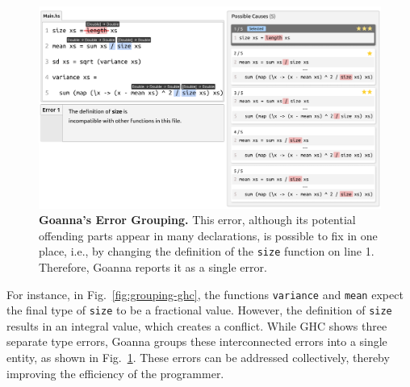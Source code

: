 \documentclass[pdflatex,lineno,sn-nature,Numbered]{sn-jnl}%
\begin{document}
        \begin{figure}[ht!]
        \centering
        \includegraphics[width=\linewidth]{images/Goanna-Error-Grouping.pdf}
        \caption[Goanna's Error Grouping]{\textbf{Goanna's Error Grouping.} This error, although its potential offending parts appear in many declarations, is possible to fix in one place, i.e., by changing the definition of the \texttt{size} function on line 1. Therefore, Goanna reports it as a single error.}
        \label{fig:grouping-goanna}
    \end{figure}

    For instance, in Fig.~\ref{fig:grouping-ghc}, the functions \texttt{variance} and \texttt{mean} expect the final type of \texttt{size} to be a fractional value. However, the definition of \texttt{size} results in an integral value, which creates a conflict. While GHC shows three separate type errors, Goanna groups these interconnected errors into a single entity, as shown in Fig.~\ref{fig:grouping-goanna}. These errors can be addressed collectively, thereby improving the efficiency of the programmer.

    
\end{document}
